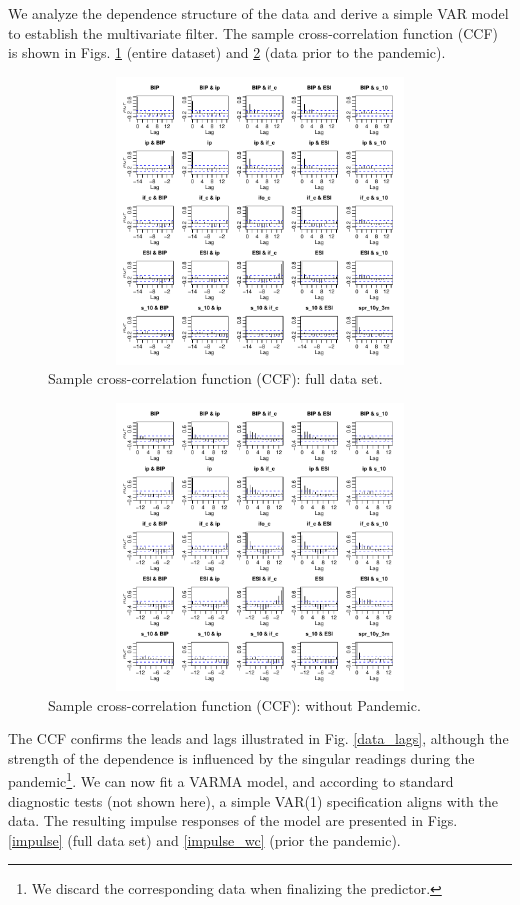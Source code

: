 \documentclass[a4paper]{article}
\begin{document}
We analyze the dependence structure of the data and derive a simple VAR model to establish the multivariate filter. The sample cross-correlation function (CCF) is shown in Figs. \ref{CCF} (entire dataset) and \ref{CCF_wc} (data prior to the pandemic).  
\begin{figure}[H]\begin{center}\includegraphics[height=3in, width=4.5in]{./Figures/CCF.pdf}\caption{Sample cross-correlation function (CCF): full data set.\label{CCF}}\end{center}\end{figure}\begin{figure}[H]\begin{center}\includegraphics[height=3in, width=4.5in]{./Figures/CCF_wc.pdf}\caption{Sample cross-correlation function (CCF): without Pandemic.\label{CCF_wc}}\end{center}\end{figure}The CCF confirms the leads and lags illustrated in Fig. \ref{data_lags}, although the strength of the dependence is influenced by the singular readings during the pandemic\footnote{We discard the corresponding data when finalizing the predictor.}. We can now fit a VARMA model, and according to standard diagnostic tests (not shown here), a simple VAR(1) specification aligns with the data. The resulting impulse responses of the model are presented in Figs. \ref{impulse} (full data set) and \eqref{impulse_wc} (prior the pandemic).
\end{document}
